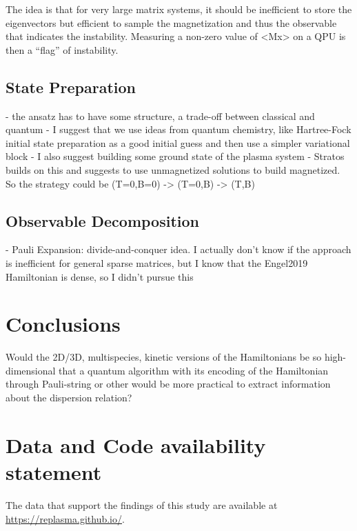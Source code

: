 \documentclass[12pt]{iopart}
\begin{document}
The idea is that for very large matrix systems, it should be inefficient to store the eigenvectors but efficient to sample the magnetization and thus the observable that indicates the instability. 
Measuring a non-zero value of <Mx> on a QPU is then a “flag” of instability.



\subsection{State Preparation}

- the ansatz has to have some structure, a trade-off between classical and quantum
- I suggest that we use ideas from quantum chemistry, like Hartree-Fock initial state preparation as a good initial guess and then use a simpler variational block
- I also suggest building some ground state of the plasma system
- Stratos builds on this and suggests to use unmagnetized solutions to build magnetized. So the strategy could be (T=0,B=0) -> (T=0,B) -> (T,B)



\subsection{Observable Decomposition}

- Pauli Expansion: divide-and-conquer idea. I actually don't know if the approach is inefficient for general sparse matrices, but I know that the Engel2019 Hamiltonian is dense, so I didn't pursue this



\section{Conclusions}

Would the 2D/3D, multispecies, kinetic versions of the Hamiltonians be so high-dimensional that a quantum algorithm with its encoding of the Hamiltonian through Pauli-string or other would be more practical to extract information about the dispersion relation?



\section{Data and Code availability statement}\label{sc:codeavailability}

The data that support the findings of this study are available at \url{https://replasma.github.io/}.
\end{document}
